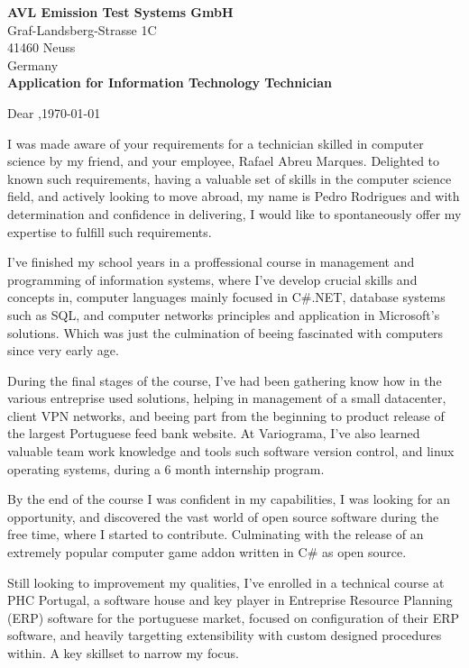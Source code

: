 \documentclass{letter}
\renewcommand*{\opening}[1]{\vspace{2\parskip}%
#1 \toname,\hfill\today\par\nobreak
}
\begin{document}
\begin{letter}{}

\textbf{AVL Emission Test Systems GmbH}\\
Graf-Landsberg-Strasse 1C\\
41460 Neuss\\
Germany\\

\textbf{Application for Information Technology Technician}

\opening{Dear}

I was made aware of your requirements for a technician skilled in computer science by my friend,
and your employee, Rafael Abreu Marques. Delighted to known such requirements, having a valuable
set of skills in the computer science field, and actively looking to move abroad, my name is Pedro
Rodrigues and with determination and confidence in delivering, I would like to spontaneously offer
my expertise to fulfill such requirements.

I've finished my school years in a proffessional course in management and programming of
information systems, where I've develop crucial skills and concepts in, computer languages mainly
focused in C\#.NET, database systems such as SQL, and computer networks principles and application
in Microsoft's solutions. Which was just the culmination of beeing fascinated with computers since
very early age.

During the final stages of the course, I've had been gathering know how in the various entreprise
used solutions, helping in management of a small datacenter, client VPN networks, and beeing part
from the beginning to product release of the largest Portuguese feed bank website. At Variograma,
I've also learned valuable team work knowledge and tools such software version control, and linux
operating systems, during a 6 month internship program.

By the end of the course I was confident in my capabilities, I was looking for an opportunity, and
discovered the vast world of open source software during the free time, where I started to
contribute. Culminating with the release of an extremely popular computer game addon written in C\#
as open source.

Still looking to improvement my qualities, I've enrolled in a technical course at PHC Portugal, a
software house and key player in Entreprise Resource Planning (ERP) software for the portuguese
market, focused on configuration of their ERP software, and heavily targetting extensibility with
custom designed procedures within. A key skillset to narrow my focus.


\end{letter}
\end{document}
